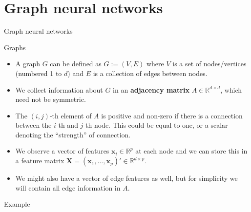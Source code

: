 \documentclass{beamer}
\begin{document}
\section{Graph neural networks}
\begin{frame}
\begin{center}
\Huge Graph neural networks
\end{center}
\end{frame}
\begin{frame}{Graphs}
\begin{itemize}
\item A graph $G$ can be defined as $G:=(V,E)$ where $V$ is a set of nodes/vertices (numbered 1 to $d$) and $E$ is a collection of edges between nodes.
\item We collect information about $G$ in an \textbf{adjacency matrix} $A\in\mathbb{R}^{d \times d}$, which need not be symmetric.
\item The $(i,j)$-th element of $A$ is positive and non-zero if there is a connection between the $i$-th and $j$-th node. This could be equal to one, or a scalar denoting the ``strength'' of connection. 
\item We observe a vector of features $\mathbf{x}_i \in \mathbb{R}^p$ at each node and we can store this in a feature matrix $\mathbf{X}=(\mathbf{x}_1, \dots,\mathbf{x}_p)'\in\mathbb{R}^{d\times p}$.
\item We might also have a vector of edge features as well, but for simplicity we will contain all edge information in $A$.
\end{itemize}
\end{frame}


\begin{frame}{Example}

\end{frame}
\end{document}
